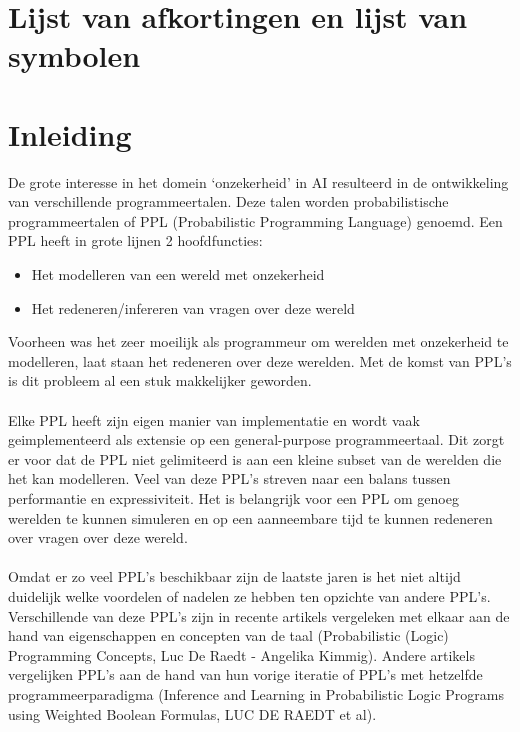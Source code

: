 \documentclass[12pt,a4paper,oneside]{book}
\begin{document}
\chapter{Lijst van afkortingen en lijst van symbolen}
\tableofcontents


\newpage
\mainmatter
\setcounter{page}{0}
\chapter{Inleiding}
De grote interesse in het domein ‘onzekerheid’ in AI resulteerd in de ontwikkeling van verschillende programmeertalen. Deze talen worden probabilistische programmeertalen of PPL (Probabilistic Programming Language) genoemd. Een PPL heeft in grote lijnen 2 hoofdfuncties:
\begin{itemize}
	\item Het modelleren van een wereld met onzekerheid
	\item Het redeneren/infereren van vragen over deze wereld
\end{itemize}
Voorheen was het zeer moeilijk als programmeur om werelden met onzekerheid te modelleren, laat staan het redeneren over deze werelden. Met de komst van PPL’s is dit probleem al een stuk makkelijker geworden.
\\\\
Elke PPL heeft zijn eigen manier van implementatie en wordt vaak geimplementeerd als extensie op een general-purpose programmeertaal. Dit zorgt er voor dat de PPL niet gelimiteerd is aan een kleine subset van de werelden die het kan modelleren. Veel van deze PPL’s streven naar een balans tussen performantie en expressiviteit. Het is belangrijk voor een PPL om genoeg werelden te kunnen simuleren en op een aanneembare tijd te kunnen redeneren over vragen over deze wereld.
\\\\
Omdat er zo veel PPL’s beschikbaar zijn de laatste jaren is het niet altijd duidelijk welke voordelen of nadelen ze hebben ten opzichte van andere PPL’s. Verschillende van deze PPL’s zijn in recente artikels vergeleken met elkaar aan de hand van eigenschappen en concepten van de taal (Probabilistic (Logic) Programming Concepts, Luc De Raedt - Angelika Kimmig). Andere artikels vergelijken PPL’s aan de hand van hun vorige iteratie of PPL’s met hetzelfde programmeerparadigma (Inference and Learning in Probabilistic Logic Programs using Weighted Boolean Formulas, LUC DE RAEDT et al). 
\end{document}
